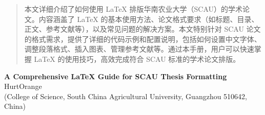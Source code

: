 \documentclass[UTF8,AutoFakeBold=1,AutoFakeSlant,zihao=-4]{SCAU}
\begin{document}
\coverpage      %



\begin{authorization}
\end{authorization}

\begin{abstract}
本文详细介绍了如何使用 LaTeX 排版华南农业大学（SCAU）的学术论文。内容涵盖了 LaTeX 的基本使用方法、论文格式要求（如标题、目录、正文、参考文献等），以及常见问题的解决方案。本文特别针对 SCAU 论文的格式需求，提供了详细的代码示例和配置说明，包括如何设置中文字体、调整段落格式、插入图表、管理参考文献等。通过本手册，用户可以快速掌握 LaTeX 的使用技巧，高效完成符合 SCAU 标准的学术论文排版。

\end{abstract}


\begin{center}
    {\textbf{\large{A Comprehensive LaTeX Guide for SCAU Thesis Formatting}}} \\[1ex]        %
    HurtOrange \\[1ex]         %
    (College of Science, South China Agricultural University, Guangzhou 510642, China)      %
\end{center}
\end{document}
